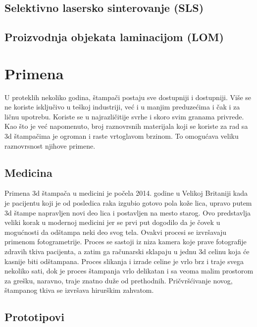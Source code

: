 \documentclass[a4paper]{article}
\begin{document}
{\subsection{Selektivno lasersko sinterovanje (SLS)}
\label{subsec:podnaslov4}


\subsection{Proizvodnja objekata laminacijom (LOM)}
\label{subsec:podnaslov5}

\newpage

\section{Primena}
\label{sec:Primena}

U proteklih nekoliko godina, štampači postaju sve dostupniji i dostupniji. Više se ne koriste isključivo u teškoj industriji, već i u manjim preduzećima i čak i za ličnu upotrebu. Koriste se u najrazličitije svrhe i skoro svim granama privrede. Kao što je već napomenuto, broj raznovrsnih materijala koji se koriste za rad sa 3d štampačima je ogroman i raste vrtoglavom brzinom. To omogućava veliku raznovrsnost njihove primene. 

\subsection{Medicina}
\label{subsec:podnaslov1}

Primena 3d štampača u medicini je počela 2014. godine u Velikoj Britaniji kada je pacijentu koji je od posledica raka izgubio gotovo pola kože lica, upravo putem 3d štampe napravljen novi deo lica i postavljen na mesto starog. Ovo predstavlja veliki korak u modernoj medicini jer se prvi put dogodilo da je čovek u mogućnosti da odštampa neki deo svog tela. 
\bigbreak Ovakvi procesi se izvršavaju primenom fotogrametrije. Proces se sastoji iz niza kamera koje prave fotografije zdravih tkiva pacijenta, a zatim ga računarski sklapaju u jednu 3d celinu koja će kasnije biti odštampana. Proces slikanja i izrade celine je vrlo brz i traje svega nekoliko sati, dok je proces štampanja vrlo delikatan i sa veoma malim prostorom za grešku, naravno, traje znatno duže od prethodnih. Pričvršćivanje novog, štampanog tkiva se izvršava hirurškim zahvatom.

\subsection{Prototipovi}
\label{subsec:podnaslov2}

}
\end{document}
